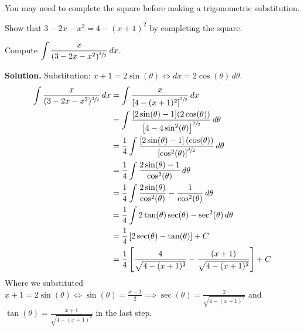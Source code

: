 \begin{Remark}{}{}
    You may need to complete the square before making a trigonometric substitution.
\end{Remark}
\begin{Exercise}{}{}
    Show that $ 3-2x-x^2=4-(x+1)^2 $ by completing the square.
\end{Exercise}
\begin{Example}{}{}
    Compute $ \displaystyle \int \frac{x}{(3-2x-x^2)^{\sfrac{3}{2}}} \, d{x} $.

    \textbf{Solution.}
    Substitution: $ x+1=2\sin(\theta)\iff dx=2\cos(\theta)\,d\theta $.
    \begin{align*}
        \int \frac{x}{(3-2x-x^2)^{\sfrac{3}{2}}} \, d{x}
         & =\int \frac{x}{\left[ 4-(x+1)^2 \right]^{\sfrac{3}{2}}} \, d{x}                                                                \\
         & =\int \frac{[2\sin(\theta)-1] (2\cos(\theta))}{\left[4-4\sin^2(\theta)\right]^{\sfrac{3}{2}}} \, d{\theta}                     \\
         & =\frac{1}{4} \int \frac{[2\sin(\theta)-1]\left(\cos(\theta)\right)}{\left[ \cos^2(\theta) \right]^{\sfrac{3}{2}}} \, d{\theta} \\
         & = \frac{1}{4} \int \frac{2\sin(\theta)-1}{\cos^2(\theta)} \, d{\theta}                                                         \\
         & =\frac{1}{4} \int \frac{2\sin(\theta)}{\cos^2(\theta)}-\frac{1}{\cos^2(\theta)} \, d{\theta}                                   \\
         & =\frac{1}{4} \int 2\tan(\theta)\sec(\theta)-\sec^2(\theta)\, d{\theta}                                                         \\
         & =\frac{1}{4} \left[ 2\sec(\theta)-\tan(\theta) \right]+C                                                                       \\
         & =\frac{1}{4} \left[ \frac{4}{\sqrt{4-(x+1)^2}}-\frac{(x+1)}{\sqrt{4-(x+1)^2}} \right]+C
    \end{align*}
    Where we substituted $ \displaystyle
        x+1=2\sin(\theta)\iff \sin(\theta)=\frac{x+1}{2}\implies
        \sec(\theta)=\frac{2}{\sqrt{4-(x+1)^2}} $ and $
        \displaystyle \tan(\theta)=\frac{x+1}{\sqrt{4-(x+1)^2}} $
    in the last step.
\end{Example}

